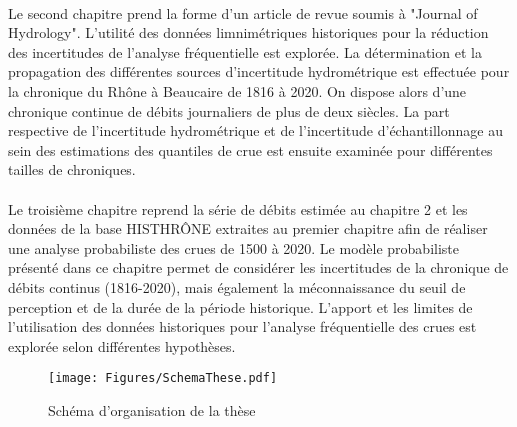 \documentclass[11pt]{article}
\begin{document}
	\paragraph{} Le second chapitre prend la forme d'un article de revue soumis à "Journal of Hydrology". L'utilité des données limnimétriques historiques pour la réduction des incertitudes de l'analyse fréquentielle est explorée. La détermination et la propagation des différentes sources d'incertitude hydrométrique est effectuée pour la chronique du Rhône à Beaucaire de 1816 à 2020. On dispose alors d'une chronique continue de débits journaliers de plus de deux siècles. La part respective de l'incertitude hydrométrique et de l'incertitude d'échantillonnage au sein des estimations des quantiles de crue est ensuite examinée pour différentes tailles de chroniques. 
	
	\paragraph{} Le troisième chapitre reprend la série de débits estimée au chapitre 2 et les données de la base HISTHRÔNE extraites au premier chapitre afin de réaliser une analyse probabiliste des crues de 1500 à 2020. Le modèle probabiliste présenté dans ce chapitre permet de considérer les incertitudes de la chronique de débits continus (1816-2020), mais également la méconnaissance du seuil de perception et de la durée de la période historique. L'apport et les limites de l'utilisation des données historiques pour l'analyse fréquentielle des crues est explorée selon différentes hypothèses. 
	

\begin{figure}[h]
	\centering
	\texttt{[image: Figures/SchemaThese.pdf]}	
	\caption{Schéma d'organisation de la thèse}
	\label{fig:SchemaThese}
\end{figure}

\FloatBarrier

\newpage

\printbibliography
\end{document}
